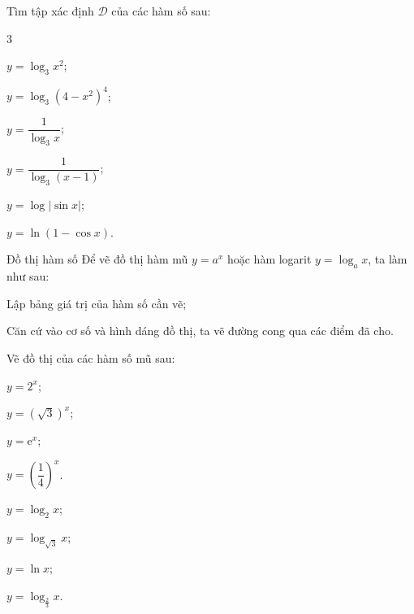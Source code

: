 \begin{vd}%
	Tìm tập xác định $\mathscr{D}$ của các hàm số sau:
	\begin{enumEX}[a)]{3}
		\item $y = \log_{3}x^2 $;
		\item $y = \log_{3}\left(4-x^2 \right)^4$;
		\item $y = \dfrac{1}{\log_{3}x}$;
		\item $y = \dfrac{1}{\log_{3}(x-1)}$;
		\item $y = \log\left|\sin x\right|$;
		\item $y = \ln\left(1- \cos x \right)$.
	\end{enumEX}
	\loigiai{
	}
\end{vd} 

\begin{dang}{Đồ thị hàm số}
	Để vẽ đồ thị hàm mũ $y=a^x$ hoặc hàm logarit $y=\log_a x$, ta làm như sau:
	\begin{listEX}[1]
		\item [\ding{172}] Lập bảng giá trị của hàm số cần vẽ;
		\item [\ding{173}] Căn cứ vào cơ số và hình dáng đồ thị, ta vẽ đường cong qua các điểm đã cho.
	\end{listEX}
\end{dang}

\begin{vd}%
	Vẽ đồ thị của các hàm số mũ sau:
	\begin{listEX}[4]
		\item $y=2^x$;
		\item  $y=(\sqrt{3})^x$;
		\item $y=\mathrm{e}^x$;
		\item  $y=\left(\dfrac{1}{4}\right)^x$.	
		\item $y=\log_2 x$;
		\item  $y=\log_{\sqrt{3}}x$;
		\item $y=\ln x$;
		\item  $y=\log_{\frac{2}{3}}x$.	
	\end{listEX}
	\loigiai{
	}
\end{vd} 

